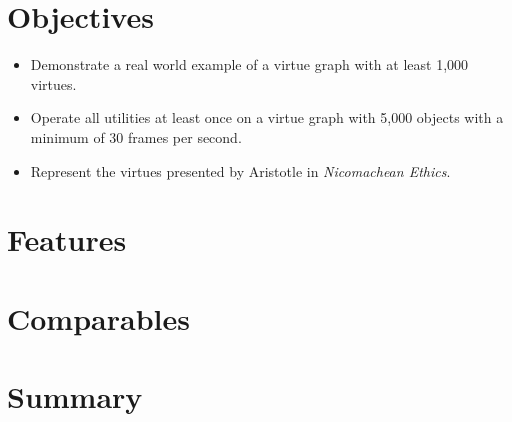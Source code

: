 \documentclass{article}
\begin{document}
\section{Objectives}

\begin{itemize}
    \item Demonstrate a real world example of a virtue graph with at least 1,000 virtues.
    \item Operate all utilities at least once on a virtue graph with 5,000 objects with a minimum of 30 frames per second.
    \item Represent the virtues presented by Aristotle in \textit{Nicomachean Ethics}.
\end{itemize}

\section{Features}


\section{Comparables}


\section{Summary}

\end{document}
